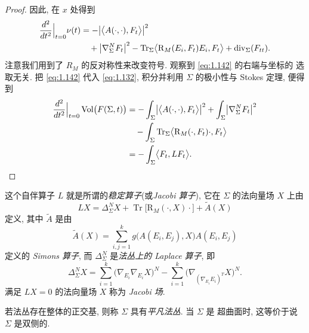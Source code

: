 \begin{proof}
因此, 在 $x$ 处得到
\begin{equation}
\begin{aligned}
\frac{d^{2}}{dt^{2}}\Big|_{t=0}\nu(t)
&=-\bigl|\bigl\langle A(\cdot,\cdot),F_t\bigr\rangle\bigr|^{2}\\
&\quad+\bigl|\nabla_{\Sigma}^{N}F_t\bigr|^{2}
 -\operatorname{Tr}_{\Sigma}
 \bigl\langle \mathrm{R}_M(E_i,F_t)E_i,F_t\bigr\rangle
 +\operatorname{div}_{\Sigma}(F_{tt}).
\end{aligned}
\label{eq:1.142}
\end{equation}
注意我们用到了 $R_M$ 的反对称性来改变符号. 观察到 \eqref{eq:1.142} 的右端与坐标的
选取无关. 把 \eqref{eq:1.142} 代入 \eqref{eq:1.132}, 积分并利用 $\Sigma$ 的极小性与 Stokes
定理, 便得到
\begin{equation}
\begin{aligned}
\frac{d^{2}}{dt^{2}}\Big|_{t=0}\operatorname{Vol}\bigl(F(\Sigma,t)\bigr)
&=-\int_{\Sigma}\bigl|\bigl\langle A(\cdot,\cdot),F_t\bigr\rangle\bigr|^{2}
 +\int_{\Sigma}\bigl|\nabla_{\Sigma}^{N}F_t\bigr|^{2}\\
&\quad-\int_{\Sigma}\operatorname{Tr}_{\Sigma}
 \bigl\langle \mathrm{R}_M(\cdot,F_t)\cdot,F_t\bigr\rangle\\
&=-\int_{\Sigma}\bigl\langle F_t,LF_t\bigr\rangle.
\end{aligned}
\label{eq:1.143}
\end{equation}
\end{proof}

这个自伴算子 $L$ 就是所谓的\emph{稳定算子}(或\emph{Jacobi 算子}), 它在
$\Sigma$ 的法向量场 $X$ 上由
\begin{equation}
LX=\Delta_{\Sigma}^{N}X
 +\operatorname{Tr}\bigl[\mathrm{R}_M(\cdot,X)\cdot\bigr]
 +\tilde A(X)
\label{eq:1.144}
\end{equation}
定义, 其中 $\tilde A$ 是由
\begin{equation}
\tilde A(X)=\sum_{i,j=1}^{k}g\bigl(A(E_i,E_j),X\bigr)A(E_i,E_j)
\label{eq:1.145}
\end{equation}
定义的 \emph{Simons 算子}, 而 $\Delta_{\Sigma}^{N}$ 是\emph{法丛上的
Laplace 算子}, 即
\begin{equation}
\Delta_{\Sigma}^{N}X
 =\sum_{i=1}^{k}\bigl(\nabla_{E_i}\nabla_{E_i}X\bigr)^{N}
 -\sum_{i=1}^{k}\bigl(\nabla_{(\nabla_{E_i}E_i)^{T}}X\bigr)^{N}.
\label{eq:1.146}
\end{equation}
满足 $LX=0$ 的法向量场 $X$ 称为 \emph{Jacobi 场}.

若法丛存在整体的正交基, 则称 $\Sigma$ 具有\emph{平凡法丛}. 当 $\Sigma$ 是
超曲面时, 这等价于说 $\Sigma$ 是双侧的.

